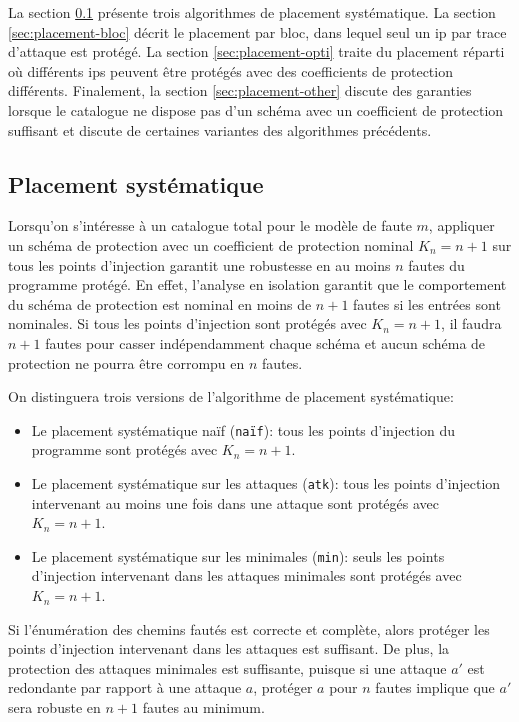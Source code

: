         La section \ref{sec:placement-syst} présente trois algorithmes de placement systématique.
        La section \ref{sec:placement-bloc} décrit le placement par bloc, dans lequel seul un \gls{ip} par trace d'attaque est protégé.
        La section \ref{sec:placement-opti} traite du placement réparti où différents \gls{ip}s peuvent être protégés avec des coefficients de protection différents.
        Finalement, la section \ref{sec:placement-other} discute des garanties lorsque le catalogue ne dispose pas d'un schéma avec un coefficient de protection suffisant et discute de certaines variantes des algorithmes précédents.  
            
        \subsection{Placement systématique}
        \label{sec:placement-syst}

            Lorsqu'on s'intéresse à un catalogue total pour le modèle de faute $m$, appliquer un schéma de protection avec un coefficient de protection nominal $K_n = n+1$ sur tous les points d'injection garantit une robustesse en au moins $n$ fautes du programme protégé. 
            En effet, l'analyse en isolation garantit que le comportement du schéma de protection est nominal en moins de $n + 1$ fautes si les entrées sont nominales. Si tous les points d'injection sont protégés avec $K_n = n+1$, il faudra $n + 1$ fautes pour casser indépendamment chaque schéma et aucun schéma de protection ne pourra être corrompu en $n$ fautes.

            On distinguera trois versions de l'algorithme de placement systématique:
            \begin{itemize}
                \item Le placement systématique naïf (\texttt{naïf}): tous les points d'injection du programme sont protégés avec $K_n = n+1$.
                \item Le placement systématique sur les attaques (\texttt{atk}): tous les points d'injection intervenant au moins une fois dans une attaque sont protégés avec $K_n = n+1$.
                \item Le placement systématique sur les minimales (\texttt{min}): seuls les points d'injection intervenant dans les attaques minimales sont protégés avec $K_n = n+1$.
            \end{itemize}

            Si l'énumération des chemins fautés est correcte et complète, alors protéger les points d'injection intervenant dans les attaques est suffisant.
            De plus, la protection des attaques minimales est suffisante, puisque si une attaque $a'$ est redondante par rapport à une attaque $a$, protéger $a$ pour $n$ fautes implique que $a'$ sera robuste en $n+1$ fautes au minimum.

